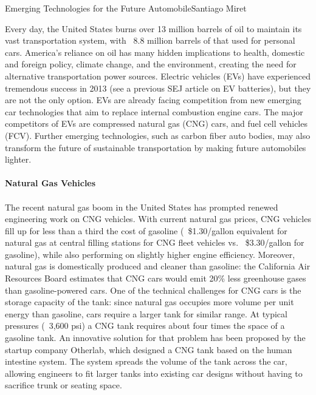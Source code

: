 \documentclass{papertex}
\begin{document}
\begin{news}{2}{Emerging Technologies for the Future Automobile}{Santiago Miret}{}{}

Every day, the United States burns over 13 million barrels of oil to maintain
its vast transportation system, with ~8.8 million barrels of that used for
personal cars. America's reliance on oil has many hidden implications to health,
domestic and foreign policy, climate change, and the environment, creating the
need for alternative transportation power sources. Electric vehicles (EVs) have
experienced tremendous success in 2013 (see a previous SEJ article on EV
batteries), but they are not the only option. EVs are already facing competition
from new emerging car technologies that aim to replace internal combustion
engine cars. The major competitors of EVs are compressed natural gas (CNG) cars,
and fuel cell vehicles (FCV). Further emerging technologies, such as carbon
fiber auto bodies, may also transform the future of sustainable transportation
by making future automobiles lighter.
\\
\\
\textbf{Natural Gas Vehicles}
\\
\\
The recent natural gas boom in the United States has prompted renewed
engineering work on CNG vehicles. With current natural gas prices, CNG vehicles
fill up for less than a third the cost of gasoline (~\$1.30/gallon equivalent
for natural gas at central filling stations for CNG fleet vehicles vs.
~\$3.30/gallon for gasoline), while also performing on slightly higher engine
efficiency. Moreover, natural gas is domestically produced and cleaner than
gasoline: the California Air Resources Board estimates that CNG cars would emit
20\% less greenhouse gases than gasoline-powered cars. One of the technical
challenges for CNG cars is the storage capacity of the tank: since natural gas
occupies more volume per unit energy than gasoline, cars require a larger tank
for similar range. At typical pressures (~3,600 psi) a CNG tank requires about
four times the space of a gasoline tank. An innovative solution for that problem
has been proposed by the startup company Otherlab, which designed a CNG tank
based on the human intestine system. The system spreads the volume of the tank
across the car, allowing engineers to fit larger tanks into existing car designs
without having to sacrifice trunk or seating space.


\end{news}
\end{document}
